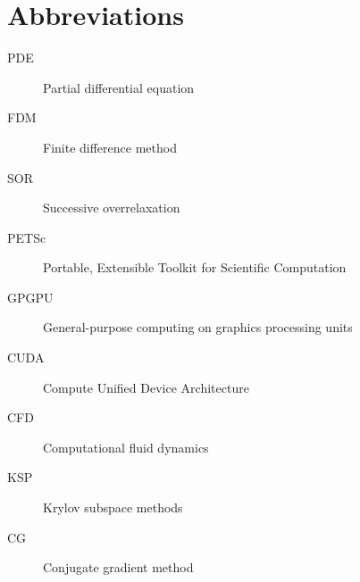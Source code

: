 \chapter{Abbreviations}

\begin{description}
	\item[PDE] Partial differential equation
	\item[FDM] Finite difference method
	\item[SOR] Successive overrelaxation
	\item[PETSc] Portable, Extensible Toolkit for Scientific Computation
	\item[GPGPU] General-purpose computing on graphics processing units
	\item[CUDA] Compute Unified Device Architecture
	\item[CFD] Computational fluid dynamics
	\item[KSP] Krylov subspace methods
	\item[CG] Conjugate gradient method
\end{description}
